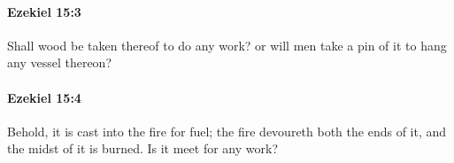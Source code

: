 		\paragraph{Ezekiel 15:3} %
			\label{EZEKIEL-15-3}

			Shall wood be taken thereof to do any work? or will men take a pin of it to hang any vessel thereon?


		\paragraph{Ezekiel 15:4} %
			\label{EZEKIEL-15-4}

			Behold, it is cast into the fire for fuel; the fire devoureth both the ends of it, and the midst of it is burned. Is it meet for any work?


